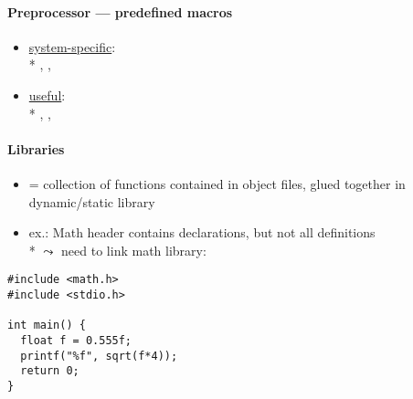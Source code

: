 \paragraph{Preprocessor --- predefined macros}
\begin{itemize}
  \item \underline{system-specific}: \\*
    , , 
  \item \underline{useful}: \\*
    , , 
\end{itemize}

\paragraph{Libraries}
\begin{itemize}
  \item = collection of functions contained in object files, glued together in dynamic/static library
  \item ex.: Math header contains declarations, but not all definitions \\*
    \( \leadsto \) need to link math library: 
\end{itemize}
\begin{lstlisting}[style=customc]
#include <math.h>
#include <stdio.h>

int main() {
  float f = 0.555f;
  printf("%f", sqrt(f*4));
  return 0;
}
\end{lstlisting}